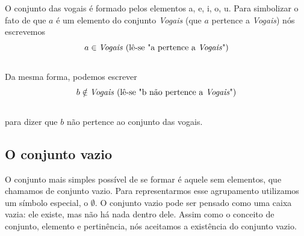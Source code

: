 O conjunto das vogais é formado pelos elementos a, e, i, o, u. Para simbolizar o fato de que $a$ é um elemento do conjunto \emph{Vogais} (que $a$ pertence a \emph{Vogais}) nós escrevemos\\ $$a \in \text{\emph{Vogais} (lê-se "a pertence a \emph{Vogais}")}$$\\Da mesma forma, podemos escrever\\ $$b \notin \text{\emph{Vogais} (lê-se "b não pertence a \emph{Vogais}")}$$\\para dizer que $b$ não pertence ao conjunto das vogais.

\subsection{O conjunto vazio}
O conjunto mais simples possível de se formar é aquele sem elementos, que chamamos de conjunto vazio. Para representarmos esse agrupamento utilizamos um símbolo especial, o $\emptyset$. O conjunto vazio pode ser pensado como uma caixa vazia: ele existe, mas não há nada dentro dele. Assim como o conceito de conjunto, elemento e pertinência, nós aceitamos a existência do conjunto vazio.

